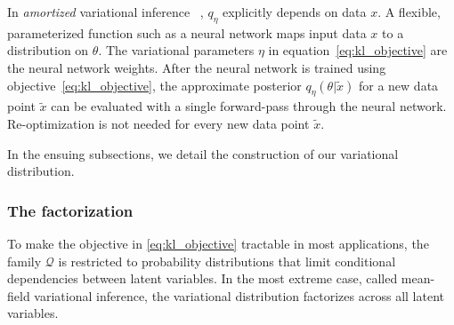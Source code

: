 In {\itshape amortized} variational inference
~\cite{kingma2013autoencoding, rezende2014stochastic}, $q_\eta$ explicitly depends on data $x$. A flexible, parameterized function such as a neural network maps input data $x$ to
a distribution on $\theta$. 
The variational parameters $\eta$ in equation~\eqref{eq:kl_objective} 
are the neural network weights. 
After the neural network is trained using 
objective~\eqref{eq:kl_objective}, the 
approximate posterior $q_\eta(\theta | \tilde x)$ for a new data point 
$\tilde x$ can be evaluated with a single forward-pass through the neural network. 
Re-optimization is not needed for every new data point $\tilde x$. 

In the ensuing subsections, we detail the construction of our variational distribution. 

\subsubsection{The factorization}
\label{sec:factorization}
To make the objective in \eqref{eq:kl_objective} tractable in most 
applications, the family $\mathcal{Q}$ is restricted to probability distributions 
that limit conditional dependencies between latent variables. In the most extreme case, called mean-field variational inference, the variational distribution factorizes across all latent variables. 

